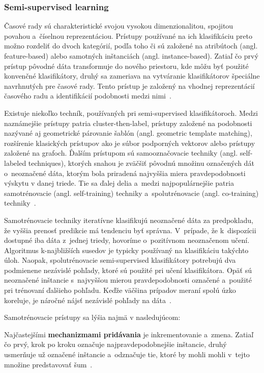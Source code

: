 \documentclass[a4paper,twoside,slovak,12pt]{article}
\begin{document}
\subsubsection{Semi-supervised learning}
Časové rady sú charakteristické svojou vysokou dimenzionalitou, spojitou povahou
a~číselnou reprezentáciou. Prístupy používané na ich klasifikáciu preto možno
rozdeliť do dvoch kategórií, podľa toho či sú založené na atribútoch (angl.
feature-based) alebo samotných inštanciách (angl. instance-based). Zatiaľ čo
prvý prístup pôvodné dáta transformuje do nového priestoru, kde môžu byť použité
konvenčné klasifikátory, druhý sa zameriava na vytváranie klasifikátorov
špeciálne navrhnutých pre časové rady. Tento prístup je založený na vhodnej
reprezentácií časového radu a identifikácií podobnosti medzi
nimi~\cite{Gonzalez2017}.

Existuje niekoľko techník, používaných pri semi-supervised klasifikátoroch.
Medzi naznámejšie prístupy patria cluster-then-label, prístupy založené na
podobnosti nazývané aj geometrické párovanie šablón (angl. geometric template
matching), rozšírenie klasických prístupov ako je súbor podporných vektorov
alebo prístupy založené na grafoch. Ďalším prístupom sú samooznačovacie techniky
(angl. self-labeled techniques), ktorých snahou je zväčšiť pôvodnú množinu
označených dát o~neoznačené dáta, ktorým bola priradená najvyššia miera
pravdepodobnosti výskytu v danej triede. Tie sa ďalej delia a~medzi
najpopulárnejšie patria samotrénovacie (angl. self-training) techniky
a~spolutrénovacie (angl. co-training) techniky~\cite{Gonzalez2017}.

Samotrénovacie techniky iteratívne klasifikujú neoznačené dáta za predpokladu,
že vyššia prenosť predikcie má tendenciu byť správna. V~prípade, že k~dispozícii
dostupné iba dáta z~jednej triedy, hovoríme o~pozitívnom neoznačenom učení.
Algoritmus k-najbližších susedov je typicky používaný na klasifikáciu takýchto
úloh. Naopak, spolutrénovacie semi-supervised klasifikátory potrebujú dva
podmienene nezávislé pohľady, ktoré sú použité pri učení klasifikátora. Opäť sú
neoznačené inštancie s~najvyššou mierou pravdepodobnosti označené a~použité pri
trénovaní ďalšieho pohľadu. Keďže väčšina prípadov meraní spolú úzko koreluje,
je náročné nájsť nezávislé pohľady na dáta~\cite{Gonzalez2017}.

Samotrénovacie prístupy sa lýšia najmä v nasledujúcom:

Najčastejšími \textbf{mechanizmami pridávania} je inkrementovanie a~zmena.
Zatiaľ čo prvý, krok po kroku označuje najpravdepodobnejšie inštancie, druhý
usmerňuje už označené inštancie a~odznačuje tie, ktoré by mohli mohli v~tejto
množine predstavovať šum~\cite{Gonzalez2017}.
\end{document}
